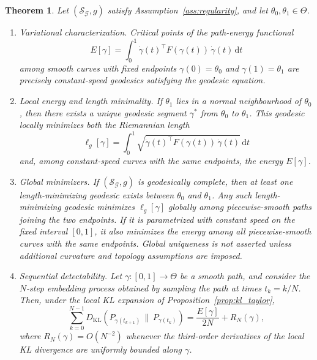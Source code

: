 \documentclass[a4paper,fleqn]{cas-dc}
\newtheorem{theorem}{Theorem}
\newcommand{\calS}{\mathcal{S}}
\newcommand{\calG}{\mathcal{G}}
\newcommand{\DKL}{D_{\mathrm{KL}}}
\begin{document}
\begin{theorem}
  \label{thm:geodesic_optimality}
  Let $(\calS_{\calG},g)$ satisfy Assumption~\ref{ass:regularity}, and let
  $\theta_0,\theta_1\in\Theta$.

  \begin{enumerate}
    \item[(i)] \emph{Variational characterization.}
    Critical points of the path-energy functional
    \begin{equation}
      E[\gamma]
      =
      \int_0^1
      \dot\gamma(t)^\top F(\gamma(t))\,\dot\gamma(t)
      \,\mathrm{d}t
      \label{eq:path_energy_variational}
    \end{equation}
    among smooth curves with fixed endpoints $\gamma(0)=\theta_0$ and
    $\gamma(1)=\theta_1$ are precisely constant-speed geodesics satisfying
    the geodesic equation.

    \item[(ii)] \emph{Local energy and length minimality.}
    If $\theta_1$ lies in a normal neighbourhood of $\theta_0$, then there
    exists a unique geodesic segment $\gamma^*$ from $\theta_0$ to
    $\theta_1$.  This geodesic locally minimizes both the Riemannian length
    \begin{equation}
      \ell_g[\gamma]
      =
      \int_0^1
      \sqrt{
        \dot\gamma(t)^\top F(\gamma(t))\,\dot\gamma(t)
      }
      \,\mathrm{d}t
      \label{eq:riemannian_length}
    \end{equation}
    and, among constant-speed curves with the same endpoints, the energy
    $E[\gamma]$.

    \item[(iii)] \emph{Global minimizers.}
    If $(\calS_{\calG},g)$ is geodesically complete, then at least one
    length-minimizing geodesic exists between $\theta_0$ and $\theta_1$.
    Any such length-minimizing geodesic minimizes $\ell_g[\gamma]$ globally
    among piecewise-smooth paths joining the two endpoints.  If it is parametrized with constant speed on the fixed interval $[0,1]$, it also minimizes the energy among all piecewise-smooth curves with the same
endpoints. Global uniqueness is not asserted unless
    additional curvature and topology assumptions are imposed.

    \item[(iv)] \emph{Sequential detectability.}
    Let $\gamma:[0,1]\to\Theta$ be a smooth path, and consider the
    $N$-step embedding process obtained by sampling the path at times
    $t_k=k/N$.  Then, under the local KL expansion of
    Proposition~\ref{prop:kl_taylor},
    \begin{equation}
      \sum_{k=0}^{N-1}
      \DKL\!\left(
        P_{\gamma(t_{k+1})}
        \,\|\,
        P_{\gamma(t_k)}
      \right)
      =
      \frac{E[\gamma]}{2N}
      +
      R_N(\gamma),
      \label{eq:sequential_kl}
    \end{equation}
    where $R_N(\gamma)=O(N^{-2})$ whenever the third-order derivatives of
    the local KL divergence are uniformly bounded along $\gamma$.
  \end{enumerate}
\end{theorem}
\end{document}
